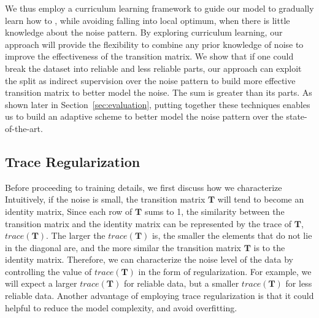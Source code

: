 We thus employ a curriculum
learning framework to guide our model to gradually learn how to 
, while avoiding falling into local optimum, 
when there is little knowledge about the noise pattern.
%
%
By exploring curriculum learning, our approach will  provide the
flexibility to combine any prior knowledge of noise to improve the
effectiveness of  the transition matrix. We show that if one could break the
dataset into reliable and less reliable parts, our approach can exploit the split
as indirect supervision over the noise pattern to build more effective
transition matrix to better model the noise. The sum is greater than its parts. 
As shown later in Section~\ref{sec:evaluation}, putting together these techniques
enables us to build an adaptive scheme to better model the noise pattern over the state-of-the-art. 




\subsection{Trace Regularization}
Before proceeding to training details, we first discuss how we characterize 
Intuitively, if the noise is small, the transition matrix $\mathbf{T}$ will tend to become an identity matrix,   Since each row of $\mathbf{T}$ sums to 1, the similarity between the transition matrix and the identity matrix can be represented by the trace of $\mathbf{T}$, $trace(\mathbf{T})$. The larger the $trace(\mathbf{T})$ is, the smaller the elements that do not lie in the diagonal are, and the more similar the transition matrix $\mathbf{T}$ is to the identity matrix. Therefore, we can characterize  the noise level of the data by controlling the  value of $trace(\mathbf{T})$ in the form of regularization. For example, we will expect a larger $trace(\mathbf{T})$ for reliable data, but  a smaller $trace(\mathbf{T})$  for less reliable data. Another advantage of employing trace regularization is that it could helpful to reduce the model complexity,  %
and avoid overfitting. 

